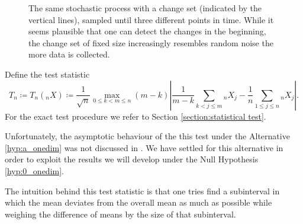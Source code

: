 \begin{figure} 
   \centering
   \caption{The same stochastic process with a change set (indicated by the vertical lines), sampled until three different points in time. While it seems plausible that one can detect the changes in the beginning, the change set of fixed size increasingly resembles random noise the more data is collected.}
   \label{figure:prozess drei mal}
\end{figure}

Define the test statistic
\begin{equation} \label{def:Tn onedim}
    T_n \coloneqq T_n({}_{n}X) \coloneqq \frac{1}{\sqrt{n}} \max\limits_{0 \leq k < m \leq n} (m-k) \left| \frac{1}{m-k} \sum\limits_{k < j \leq m} {}_{n}X_j - \frac{1}{n} \sum\limits_{1 \leq j \leq n} {}_{n}X_j \right|.
\end{equation}
For the exact test procedure we refer to Section \ref{section:statistical test}.

Unfortunately, the asymptotic behaviour of the this test under the Alternative \ref{hyp:a_onedim} was not discussed in \cite{[0]BUCCHIA2017344}. We have settled for this alternative in order to exploit the results we will develop under the Null Hypothesis \ref{hyp:0_onedim}.

\begin{remark}
    The intuition behind this test statistic is that one tries find a subinterval in which the mean deviates from the overall mean as much as possible while weighing the difference of means by the size of that subinterval.
\end{remark}

